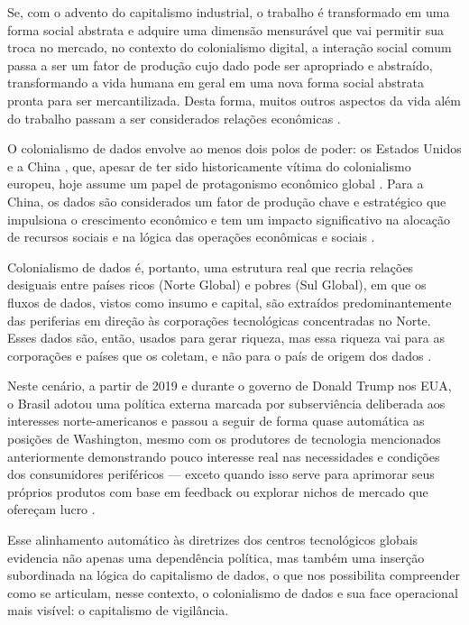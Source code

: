 
Se, com o advento do capitalismo industrial, o trabalho é transformado em uma forma social abstrata e adquire uma dimensão mensurável que vai permitir sua troca no mercado, no contexto do colonialismo digital, a interação social comum passa a ser um fator de produção cujo dado pode ser apropriado e abstraído, transformando a vida humana em geral em uma nova forma social abstrata pronta para ser mercantilizada. Desta forma, muitos outros aspectos da vida além do trabalho passam a ser considerados relações econômicas \cite{couldry2018}.

O colonialismo de dados envolve ao menos dois polos de poder: os Estados Unidos e a China \cite{couldry2018}, que, apesar de ter sido historicamente vítima do colonialismo europeu, hoje assume um papel de protagonismo econômico global \cite{Silveira2021}.  Para a China, os dados são considerados um fator de produção chave e estratégico que impulsiona o crescimento econômico e tem um impacto significativo na alocação de recursos sociais e na lógica das operações econômicas e sociais \cite{feifei2024}.

Colonialismo de dados é, portanto, uma estrutura real que recria relações desiguais entre países ricos (Norte Global) e pobres (Sul Global), em que os fluxos de dados, vistos como insumo e capital, são extraídos predominantemente das periferias em direção às corporações tecnológicas concentradas no Norte. Esses dados são, então, usados para gerar riqueza, mas essa riqueza vai para as corporações e países que os coletam, e não para o país de origem dos dados \cite{Silveira2021}.

Neste cenário, a partir de 2019 e durante o governo de Donald Trump nos EUA, o Brasil adotou uma política externa marcada por subserviência deliberada aos interesses norte-americanos e passou a seguir de forma quase automática as posições de Washington, mesmo com os produtores de tecnologia mencionados anteriormente demonstrando pouco interesse real nas necessidades e condições dos consumidores periféricos — exceto quando isso serve para aprimorar seus próprios produtos com base em feedback ou explorar nichos de mercado que ofereçam lucro \cite{Silveira2021}.

Esse alinhamento automático às diretrizes dos centros tecnológicos globais evidencia não apenas uma dependência política, mas também uma inserção subordinada na lógica do capitalismo de dados, o que nos possibilita compreender como se articulam, nesse contexto, o colonialismo de dados e sua face operacional mais visível: o capitalismo de vigilância.

